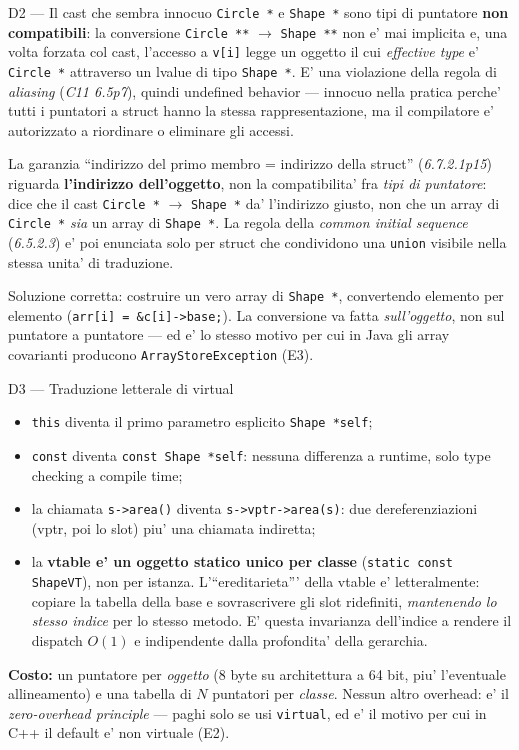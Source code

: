 \documentclass{report}
\newcommand{\code}[1]{\texttt{\small #1}}
\begin{document}
\begin{soluzione}{D2 --- Il cast che sembra innocuo}
\label{sol:D2}
\code{Circle *} e \code{Shape *} sono tipi di puntatore \textbf{non
compatibili}: la conversione \code{Circle **} $\rightarrow$ \code{Shape **} non
e' mai implicita e, una volta forzata col cast, l'accesso a \code{v[i]} legge un
oggetto il cui \emph{effective type} e' \code{Circle *} attraverso un lvalue di
tipo \code{Shape *}. E' una violazione della regola di \emph{aliasing}
(\emph{C11 6.5p7}), quindi undefined behavior --- innocuo nella pratica perche'
tutti i puntatori a struct hanno la stessa rappresentazione, ma il compilatore e'
autorizzato a riordinare o eliminare gli accessi.

La garanzia ``indirizzo del primo membro = indirizzo della struct''
(\emph{6.7.2.1p15}) riguarda \textbf{l'indirizzo dell'oggetto}, non la
compatibilita' fra \emph{tipi di puntatore}: dice che il cast
\code{Circle *} $\rightarrow$ \code{Shape *} da' l'indirizzo giusto, non che un
array di \code{Circle *} \emph{sia} un array di \code{Shape *}. La regola della
\emph{common initial sequence} (\emph{6.5.2.3}) e' poi enunciata solo per struct
che condividono una \code{union} visibile nella stessa unita' di traduzione.

Soluzione corretta: costruire un vero array di \code{Shape *}, convertendo
elemento per elemento (\code{arr[i] = \&c[i]->base;}). La conversione va fatta
\emph{sull'oggetto}, non sul puntatore a puntatore --- ed e' lo stesso motivo per
cui in Java gli array covarianti producono \code{ArrayStoreException} (E3).
\end{soluzione}

\begin{soluzione}{D3 --- Traduzione letterale di virtual}
\label{sol:D3}
\begin{itemize}
    \item \code{this} diventa il primo parametro esplicito \code{Shape *self};
    \item \code{const} diventa \code{const Shape *self}: nessuna differenza a
          runtime, solo type checking a compile time;
    \item la chiamata \code{s->area()} diventa \code{s->vptr->area(s)}: due
          dereferenziazioni (vptr, poi lo slot) piu' una chiamata indiretta;
    \item la \textbf{vtable e' un oggetto statico unico per classe}
          (\code{static const ShapeVT}), non per istanza. L'``ereditarieta''' della
          vtable e' letteralmente: copiare la tabella della base e sovrascrivere
          gli slot ridefiniti, \emph{mantenendo lo stesso indice} per lo stesso
          metodo. E' questa invarianza dell'indice a rendere il dispatch $O(1)$
          e indipendente dalla profondita' della gerarchia.
\end{itemize}
\textbf{Costo:} un puntatore per \emph{oggetto} (8 byte su architettura a 64
bit, piu' l'eventuale allineamento) e una tabella di $N$ puntatori per
\emph{classe}. Nessun altro overhead: e' il \emph{zero-overhead principle} ---
paghi solo se usi \code{virtual}, ed e' il motivo per cui in C++ il default e'
non virtuale (E2).
\end{soluzione}
\end{document}
